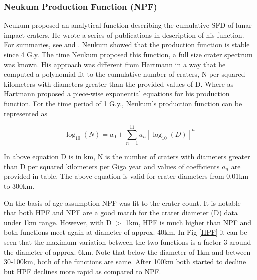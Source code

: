 \documentclass[11pt]{article}
\begin{document}
\subsubsection{Neukum Production Function (NPF)}
Neukum proposed an analytical function describing the cumulative SFD of lunar impact craters. He wrote a series of publications in description of his function. For summaries, see \cite{neukum1994crater} and \cite{neukum1983meteoritenbombardement}. Neukum showed that the production function is stable since 4 G.y. The time Neukum proposed this function, a full size crater spectrum was known. His approach was different from Hartmann in a way that he computed a polynomial fit to the cumulative number of craters, N per squared kilometers with diameters greater than the provided values of D. Where as Hartmann proposed a piece-wise exponential equations for his production function. For the time period of 1 G.y., Neukum's production function can be represented as

\begin{equation}
\log_{10} (N) = a_0 + \sum_{n=1}^{11} a_n[\log_{10} (D)]^n
\end{equation}

In above equation D is in km, N is the number of craters with diameters greater than D per squared kilometers per Giga year and values of coefficients $a_n$ are provided in table. The above equation is valid for crater diameters from 0.01km to 300km.

On the basis of age assumption NPF was fit to the crater count. It is notable that both HPF and NPF are a good match for the crater diameter (D) data under 1km range. However, with D $>$ 1km, HPF is much higher than NPF and both functions meet again at diameter of approx. 40km. In Fig \ref{HPF} it can be seen that the maximum variation between the two functions is a factor 3 around the diameter of approx. 6km. Note that below the diameter of 1km and between 30-100km, both of the functions are same. After 100km both started to decline but HPF declines more rapid as compared to NPF.
\end{document}
